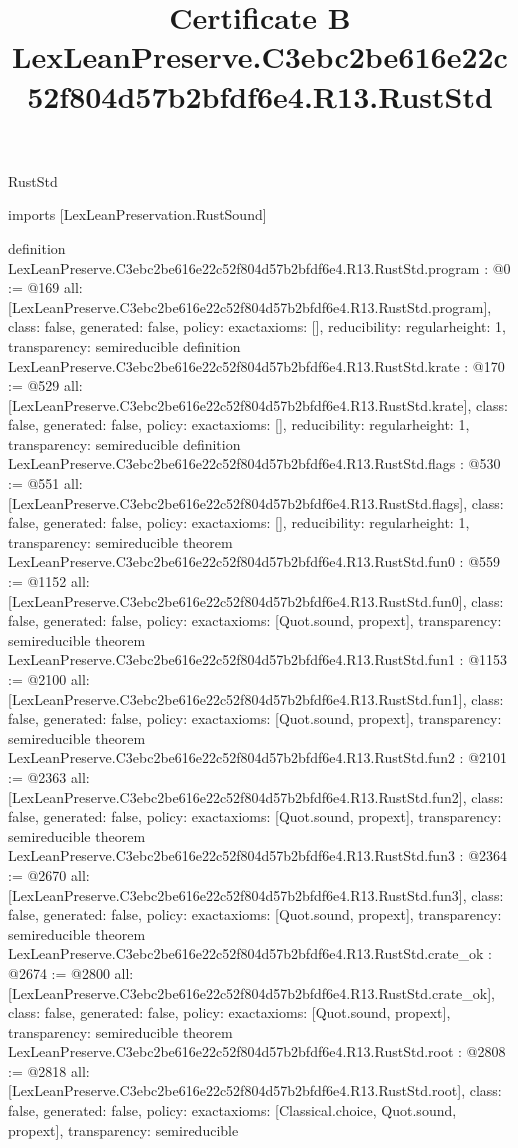 \begin{lexlean}{RustStd}
\title{Certificate B LexLeanPreserve.C3ebc2be616e22c52f804d57b2bfdf6e4.R13.RustStd}
\begin{coremodule}
imports [LexLeanPreservation.RustSound]

definition LexLeanPreserve.C3ebc2be616e22c52f804d57b2bfdf6e4.R13.RustStd.program : @0 := @169 {
  all: [LexLeanPreserve.C3ebc2be616e22c52f804d57b2bfdf6e4.R13.RustStd.program],
  class: false,
  generated: false,
  policy: exact{axioms: []},
  reducibility: regular{height: 1},
  transparency: semireducible
}
definition LexLeanPreserve.C3ebc2be616e22c52f804d57b2bfdf6e4.R13.RustStd.krate : @170 := @529 {
  all: [LexLeanPreserve.C3ebc2be616e22c52f804d57b2bfdf6e4.R13.RustStd.krate],
  class: false,
  generated: false,
  policy: exact{axioms: []},
  reducibility: regular{height: 1},
  transparency: semireducible
}
definition LexLeanPreserve.C3ebc2be616e22c52f804d57b2bfdf6e4.R13.RustStd.flags : @530 := @551 {
  all: [LexLeanPreserve.C3ebc2be616e22c52f804d57b2bfdf6e4.R13.RustStd.flags],
  class: false,
  generated: false,
  policy: exact{axioms: []},
  reducibility: regular{height: 1},
  transparency: semireducible
}
theorem LexLeanPreserve.C3ebc2be616e22c52f804d57b2bfdf6e4.R13.RustStd.fun0 : @559 := @1152 {
  all: [LexLeanPreserve.C3ebc2be616e22c52f804d57b2bfdf6e4.R13.RustStd.fun0],
  class: false,
  generated: false,
  policy: exact{axioms: [Quot.sound, propext]},
  transparency: semireducible
}
theorem LexLeanPreserve.C3ebc2be616e22c52f804d57b2bfdf6e4.R13.RustStd.fun1 : @1153 := @2100 {
  all: [LexLeanPreserve.C3ebc2be616e22c52f804d57b2bfdf6e4.R13.RustStd.fun1],
  class: false,
  generated: false,
  policy: exact{axioms: [Quot.sound, propext]},
  transparency: semireducible
}
theorem LexLeanPreserve.C3ebc2be616e22c52f804d57b2bfdf6e4.R13.RustStd.fun2 : @2101 := @2363 {
  all: [LexLeanPreserve.C3ebc2be616e22c52f804d57b2bfdf6e4.R13.RustStd.fun2],
  class: false,
  generated: false,
  policy: exact{axioms: [Quot.sound, propext]},
  transparency: semireducible
}
theorem LexLeanPreserve.C3ebc2be616e22c52f804d57b2bfdf6e4.R13.RustStd.fun3 : @2364 := @2670 {
  all: [LexLeanPreserve.C3ebc2be616e22c52f804d57b2bfdf6e4.R13.RustStd.fun3],
  class: false,
  generated: false,
  policy: exact{axioms: [Quot.sound, propext]},
  transparency: semireducible
}
theorem LexLeanPreserve.C3ebc2be616e22c52f804d57b2bfdf6e4.R13.RustStd.crate_ok : @2674 := @2800 {
  all: [LexLeanPreserve.C3ebc2be616e22c52f804d57b2bfdf6e4.R13.RustStd.crate_ok],
  class: false,
  generated: false,
  policy: exact{axioms: [Quot.sound, propext]},
  transparency: semireducible
}
theorem LexLeanPreserve.C3ebc2be616e22c52f804d57b2bfdf6e4.R13.RustStd.root : @2808 := @2818 {
  all: [LexLeanPreserve.C3ebc2be616e22c52f804d57b2bfdf6e4.R13.RustStd.root],
  class: false,
  generated: false,
  policy: exact{axioms: [Classical.choice, Quot.sound, propext]},
  transparency: semireducible
}


\end{coremodule}
\end{lexlean}
